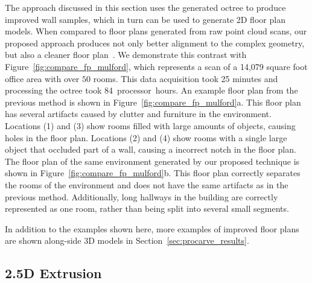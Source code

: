 \documentclass[12pt,onecolumn,oneside]{book}
\begin{document}
The approach discussed in this section uses the generated octree to produce improved wall samples, which in turn can be used to generate 2D floor plan models.  When compared to floor plans generated from raw point cloud scans, our proposed approach produces not only better alignment to the complex geometry, but also a cleaner floor plan~\cite{Turner14}.  We demonstrate this contrast with Figure~\ref{fig:compare_fp_mulford}, which represents a scan of a 14,079 square foot office area with over $50$ rooms.  This data acquisition took 25 minutes and processing the octree took 84~processor~hours.  An example floor plan from the previous method is shown in Figure~\ref{fig:compare_fp_mulford}a.  This floor plan has several artifacts caused by clutter and furniture in the environment.  Locations (1) and (3) show rooms filled with large amounts of objects, causing holes in the floor plan.  Locations (2) and (4) show rooms with a single large object that occluded part of a wall, causing a incorrect notch in the floor plan.  The floor plan of the same environment generated by our proposed technique is shown in Figure~\ref{fig:compare_fp_mulford}b.  This floor plan correctly separates the rooms of the environment and does not have the same artifacts as in the previous method.  Additionally, long hallways in the building are correctly represented as one room, rather than being split into several small segments.

In addition to the examples shown here, more examples of improved floor plans are shown along-side 3D models in Section~\ref{sec:procarve_results}.

\subsection{2.5D Extrusion}
\label{ssec:octree_fp_extrusion}
\end{document}
